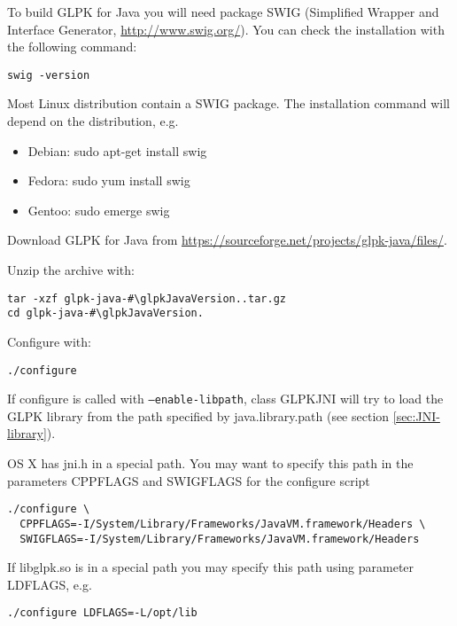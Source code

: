 \documentclass[a4paper,11pt]{report}
\newcommand{\glpkJavaVersion}{1.8.0}
\newcommand{\code}{\texttt}
\begin{document}
To build GLPK for Java you will need package SWIG (Simplified Wrapper and
Interface Generator, \href{http://www.swig.org/}{http://www.swig.org/}). You
can check the installation with the following command:

\begin{lstlisting}
swig -version
\end{lstlisting}

Most Linux distribution contain a SWIG package. The installation command will
depend on the distribution, e.g.

\begin{itemize}
\item Debian: sudo apt-get install swig
\item Fedora: sudo yum install swig
\item Gentoo: sudo emerge swig
\end{itemize}

Download GLPK for Java from \href{https://sourceforge.net/projects/glpk-java/files/}{https://sourceforge.net/projects/glpk-java/files/}.

Unzip the archive with:

\begin{lstlisting}
tar -xzf glpk-java-#\glpkJavaVersion..tar.gz
cd glpk-java-#\glpkJavaVersion.
\end{lstlisting}

Configure with:
\begin{lstlisting}
./configure
\end{lstlisting}

If configure is called with \code{--enable-libpath},
class GLPKJNI will try to load the GLPK library from the path specified by
java.library.path (see section \ref{sec:JNI-library}).

OS X has jni.h in a special path. You may want to specify this path in the
parameters CPPFLAGS and SWIGFLAGS for the configure script

\begin{lstlisting}
./configure \
  CPPFLAGS=-I/System/Library/Frameworks/JavaVM.framework/Headers \
  SWIGFLAGS=-I/System/Library/Frameworks/JavaVM.framework/Headers
\end{lstlisting}

If libglpk.so is in a special path you may specify this path using parameter
LDFLAGS, e.g.

\begin{lstlisting}
./configure LDFLAGS=-L/opt/lib
\end{lstlisting}
\end{document}
